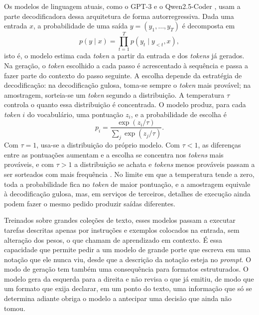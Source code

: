 Os modelos de linguagem atuais, como o GPT-3 \cite{brown2020language} e o Qwen2.5-Coder \cite{hui2024qwen25coder}, usam a parte decodificadora dessa arquitetura de forma autorregressiva. Dada uma entrada $x$, a probabilidade de uma saída $y = (y_1, \ldots, y_T)$ é decomposta em
\begin{equation}
	p(y \mid x) = \prod_{t=1}^{T} p(y_t \mid y_{<t}, x),
\end{equation}
isto é, o modelo estima cada \textit{token} a partir da entrada e dos \textit{tokens} já gerados. Na geração, o \textit{token} escolhido a cada passo é acrescentado à sequência e passa a fazer parte do contexto do passo seguinte. A escolha depende da estratégia de decodificação: na decodificação gulosa, toma-se sempre o \textit{token} mais provável; na amostragem, sorteia-se um \textit{token} segundo a distribuição. A temperatura $\tau$ controla o quanto essa distribuição é concentrada. O modelo produz, para cada \textit{token} $i$ do vocabulário, uma pontuação $z_i$, e a probabilidade de escolha é
\begin{equation}
	p_i = \frac{\exp(z_i / \tau)}{\sum_j \exp(z_j / \tau)}.
\end{equation}
Com $\tau = 1$, usa-se a distribuição do próprio modelo. Com $\tau < 1$, as diferenças entre as pontuações aumentam e a escolha se concentra nos \textit{tokens} mais prováveis, e com $\tau > 1$ a distribuição se achata e \textit{tokens} menos prováveis passam a ser sorteados com mais frequência \cite{holtzman2020curious}. No limite em que a temperatura tende a zero, toda a probabilidade fica no \textit{token} de maior pontuação, e a amostragem equivale à decodificação gulosa, mas, em serviços de terceiros, detalhes de execução ainda podem fazer o mesmo pedido produzir saídas diferentes.

Treinados sobre grandes coleções de texto, esses modelos passam a executar tarefas descritas apenas por instruções e exemplos colocados na entrada, sem alteração dos pesos, o que  chamam de aprendizado em contexto. É essa capacidade que permite pedir a um modelo de grande porte que escreva em uma notação que ele nunca viu, desde que a descrição da notação esteja no \textit{prompt}. O modo de geração tem também uma consequência para formatos estruturados. O modelo gera da esquerda para a direita e não revisa o que já emitiu, de modo que um formato que exija declarar, em um ponto do texto, uma informação que só se determina adiante obriga o modelo a antecipar uma decisão que ainda não tomou.

